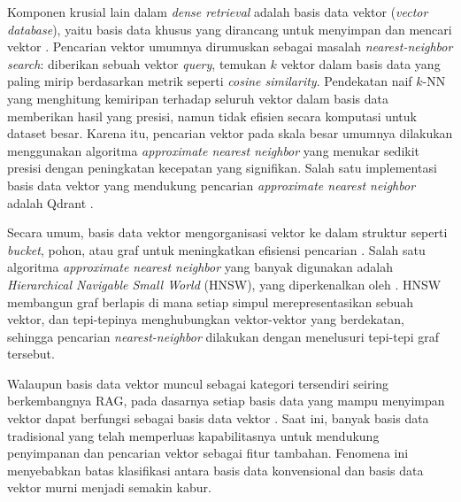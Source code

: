 Komponen krusial lain dalam \textit{dense retrieval} adalah basis data vektor (\textit{vector database}), yaitu basis data khusus yang dirancang untuk menyimpan dan mencari vektor \parencite{huyenAIEngineeringBuilding2025}. Pencarian vektor umumnya dirumuskan sebagai masalah \textit{nearest-neighbor search}: diberikan sebuah vektor \textit{query}, temukan $k$ vektor dalam basis data yang paling mirip berdasarkan metrik seperti \textit{cosine similarity}. Pendekatan naif $k$-NN yang menghitung kemiripan terhadap seluruh vektor dalam basis data memberikan hasil yang presisi, namun tidak efisien secara komputasi untuk dataset besar. Karena itu, pencarian vektor pada skala besar umumnya dilakukan menggunakan algoritma \textit{approximate nearest neighbor} yang menukar sedikit presisi dengan peningkatan kecepatan yang signifikan. Salah satu implementasi basis data vektor yang mendukung pencarian \textit{approximate nearest neighbor} adalah Qdrant \parencite{qdrantQdrant2025}.

Secara umum, basis data vektor mengorganisasi vektor ke dalam struktur seperti \textit{bucket}, pohon, atau graf untuk meningkatkan efisiensi pencarian \parencite{huyenAIEngineeringBuilding2025}. Salah satu algoritma \textit{approximate nearest neighbor} yang banyak digunakan adalah \textit{Hierarchical Navigable Small World} (HNSW), yang diperkenalkan oleh \textcite{malkovEfficientRobustApproximate2020}. HNSW membangun graf berlapis di mana setiap simpul merepresentasikan sebuah vektor, dan tepi-tepinya menghubungkan vektor-vektor yang berdekatan, sehingga pencarian \textit{nearest-neighbor} dilakukan dengan menelusuri tepi-tepi graf tersebut.

Walaupun basis data vektor muncul sebagai kategori tersendiri seiring berkembangnya RAG, pada dasarnya setiap basis data yang mampu menyimpan vektor dapat berfungsi sebagai basis data vektor \parencite{huyenAIEngineeringBuilding2025}. Saat ini, banyak basis data tradisional yang telah memperluas kapabilitasnya untuk mendukung penyimpanan dan pencarian vektor sebagai fitur tambahan. Fenomena ini menyebabkan batas klasifikasi antara basis data konvensional dan basis data vektor murni menjadi semakin kabur.

